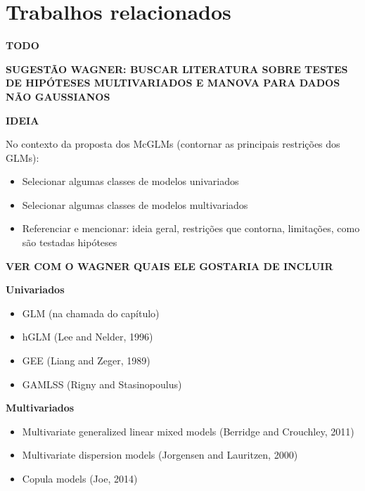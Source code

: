 \chapter{Trabalhos relacionados}


\textbf{TODO}

\textbf{SUGESTÃO WAGNER: BUSCAR LITERATURA SOBRE TESTES DE HIPÓTESES MULTIVARIADOS E MANOVA PARA DADOS NÃO GAUSSIANOS}


\textbf{IDEIA}

No contexto da proposta dos McGLMs (contornar as principais restrições dos GLMs):

\begin{itemize}
  \item Selecionar algumas classes de modelos univariados
  \item Selecionar algumas classes de modelos multivariados
  \item Referenciar e mencionar: ideia geral, restrições que contorna, limitações, como são testadas hipóteses
\end{itemize}


\textbf{VER COM O WAGNER QUAIS ELE GOSTARIA DE INCLUIR}


\textbf{Univariados}

\begin{itemize}
  
  \item GLM (na chamada do capítulo)
  
  \item hGLM (Lee and Nelder, 1996)
  
  \item GEE (Liang and Zeger, 1989)
  
  \item GAMLSS (Rigny and Stasinopoulus)
  
\end{itemize}


\textbf{Multivariados}

\begin{itemize}
 
  \item Multivariate generalized linear mixed models (Berridge and Crouchley, 2011)
  
  \item Multivariate dispersion models (Jorgensen and Lauritzen, 2000)
  
  \item Copula models (Joe, 2014)
  
\end{itemize}



